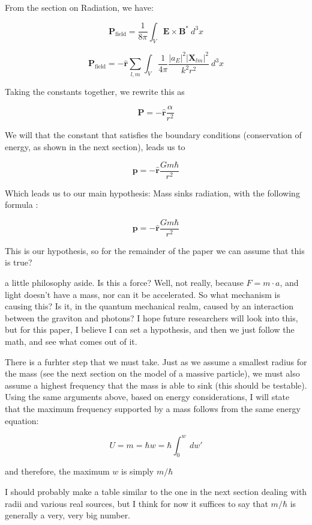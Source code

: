 \documentclass {article}
\renewcommand\vec{\mathbf}
\let\OldHat\hat
\renewcommand{\hat}[1]{\OldHat{\mathbf{#1}}}
\begin{document}
From the section on Radiation, we have:

$$\vec P_{\text{field}} = \frac 1 {8 \pi} \int_V \vec E \times \vec B^* ~ d^3x$$ 

$$\vec P_{\text{field}} = - \hat r \sum_{l, m}   \int_V \frac 1 {4 \pi}  \frac {|a_E|^2 |\vec X_{lm} |^2}{k^2 r^2} ~ d^3x $$


Taking the constants together, we rewrite this as 

$$\vec P  = - \hat r  \frac {\alpha}{r^2} $$

We will that the constant that satisfies the boundary conditions (conservation of energy, as shown in the next section), leads us to 

$$\vec p = - \hat r \frac {Gm \hbar} {r^2} $$


Which leads us to our main hypothesis:  Mass sinks radiation, with the following formula :

$$\boxed{ \vec p = - \hat r \frac {Gm \hbar} {r^2} } $$

This is our hypothesis, so for the remainder of the paper we can assume that this is true?

a little philosophy aside. Is this a force? Well, not really, because $F = m \cdot a$, and light doesn't have a mass, nor can it be accelerated. So what mechanism is causing this? Is it, in the quantum mechanical realm, caused by an interaction between the graviton and photons? I hope future researchers will look into this, but for this paper, I believe I can set a hypothesis, and then we just follow the math, and see what comes out of it.

\vspace{10pt}

There is a furhter step that we must take. Just as we assume a smallest radius for the mass (see the next section on the model of a massive particle), we must also assume a highest frequency that the mass is able to sink (this should be testable). Using the same arguments above, based on energy considerations, I will state that the maximum frequency supported by a mass follows from the same energy equation:

$$U = m = \hbar w = \hbar \int_0^w ~dw'$$

\noindent and therefore, the maximum $w$ is simply $m / \hbar$

I should probably make a table similar to the one in the next section dealing with radii and various real sources, but I think for now it suffices to say that $m / \hbar $ is generally a very, very big number.
\end{document}
